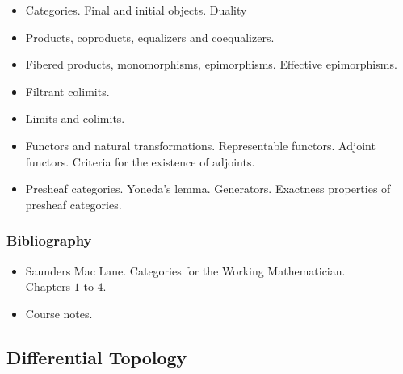 \documentclass[spanish]{article}
\begin{document}
\begin{itemize}
  \item
Categories. Final and initial objects. Duality

  \item
Products, coproducts, equalizers and coequalizers.

  \item
Fibered products, monomorphisms, epimorphisms. Effective epimorphisms.

  \item
Filtrant colimits.

  \item
Limits and colimits.

  \item
Functors and natural transformations. Representable functors.
Adjoint functors. Criteria for the existence of adjoints.

  \item
Presheaf categories. Yoneda's lemma. Generators.
Exactness properties of presheaf categories.

\end{itemize}


\subsubsection{Bibliography}
\begin{itemize}
  \item
Saunders Mac Lane. Categories for the Working Mathematician.\\
Chapters $1$ to $4$.

  \item
Course notes.

\end{itemize}


\hrulefill%

\subsection{Differential Topology}
\end{document}
